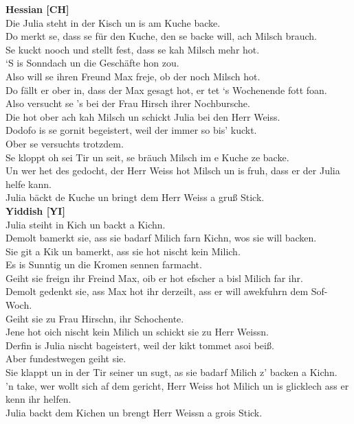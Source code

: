 \documentclass[output=paper]{LSP/langsci}
\begin{document}
\small{
\noindent\textbf{Hessian [CH]}\\
Die Julia steht in der Kisch un is am Kuche backe.\\
Do merkt se, dass se f\"ur den Kuche, den se backe will, ach Milsch brauch.\\
Se kuckt nooch und stellt fest, dass se kah Milsch mehr hot. \\
‘S is Sonndach un die Gesch\"afte hon zou.\\
Also will se ihren Freund Max freje, ob der noch Milsch hot.\\
Do f\"allt er ober in, dass der Max gesagt hot, er tet ‘s Wochenende fott foan.\\
Also versucht se ’s bei der Frau Hirsch ihrer Nochbursche.\\
Die hot ober ach kah Milsch un schickt Julia bei den Herr Weiss.\\
Dodofo is se gornit begeistert, weil der immer so bis’ kuckt.\\
Ober se versuchts trotzdem.\\
Se kloppt oh sei Tir un seit, se br\"auch Milsch im e Kuche ze backe.\\
Un wer het des gedocht, der Herr Weiss hot Milsch un is fruh, dass er der Julia helfe kann.\\
Julia b\"ackt de Kuche un bringt dem Herr Weiss a gruß Stick.\\


\noindent\textbf{Yiddish [YI]}\\
Julia steiht in Kich un backt a Kichn.\\
Demolt bamerkt sie, ass sie badarf Milich farn Kichn, wos sie will backen.\\
Sie git a Kik un bamerkt, ass sie hot nischt kein Milich.\\
Es is Sunntig un die Kromen sennen farmacht.\\
Geiht sie freign ihr Freind Max, oib er hot efscher a bisl Milich far ihr.\\
Demolt gedenkt sie, ass Max hot ihr derzeilt, ass er will awekfuhrn dem Sof-Woch.\\
Geiht sie zu Frau Hirschn, ihr Schochente.\\
Jene hot oich nischt kein Milich un schickt sie zu Herr Weissn.\\
Derfin is Julia nischt bageistert, weil der kikt tommet asoi beiß.\\
Aber fundestwegen geiht sie.\\
Sie klappt un in der Tir seiner un sugt, as sie badarf Milich z' backen a Kichn.\\
'n take, wer wollt sich af dem gericht, Herr Weiss hot Milich un is glicklech ass er kenn ihr helfen.\\
Julia backt dem Kichen un brengt Herr Weissn a grois Stick.\\


}
\end{document}
